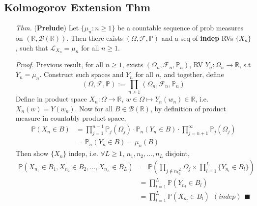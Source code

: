 \documentclass[a4paper,12pt,twoside]{book}
\begin{document}
\subsection{Kolmogorov Extension Thm}
\begin{itemize}
	\item[\textit{Thm.}] (\textbf{Prelude}) Let $\{\mu_n: n\geq 1\}$ be a countable sequence of prob measures on $(\mathbb{R}, \mathscr{B}(\mathbb{R}))$. Then there exists $(\Omega, \mathcal{F}, \mathbb{P})$ and a seq of \textbf{indep} RVs $\{X_n\}$, such that $\mathcal{L}_{X_n}=\mu_n$ for all $n\geq 1$.

	\item[\textit{Proof.}] Previous result, for all $n\geq1$, exists $(\Omega_n, \mathcal{F}_n, \mathbb{P}_n)$, RV $Y_n:\Omega_n \to \mathbb{R}$, s.t $Y_n=\mu_n$. \newline
	Construct such spaces and $Y_n$ for all $n$, and together, define 
	\begin{equation}
		(\Omega, \mathcal{F}, \mathbb{P}):=\prod_{n\geq1}(\Omega_n, \mathcal{F}_n, \mathbb{P}_n)
	\end{equation}
	Define in product space $X_n: \Omega\to \mathbb{R}$, $w\in \Omega\mapsto Y_n(w_n)\in \mathbb{R}$, i.e. $X_n(w)=Y(w_n)$. Now for all $B\in \mathscr{B}(\mathbb{R})$, by definition of product measure in countably product space,
	\begin{equation}
		\begin{split}
			\mathbb{P}\left(X_n \in B\right)&=\prod_{j=1}^{n-1}\mathbb{P}_j\left(\Omega_j\right) \cdot \mathbb{P}_n\left(Y_n\in B\right)\cdot \prod_{j=n+1}^{\infty}\mathbb{P}_j\left(\Omega_j\right)\\
			&=\mathbb{P}_n\left(Y_n \in B\right)=\mu_n(B)
		\end{split}
	\end{equation}
	Then show $\{X_n\}$ indep, i.e. $\forall L\geq 1$, $n_1, n_2, ..., n_L$ disjoint,
	\begin{equation}
		\begin{split}
			\mathbb{P}\left(X_{n_1}\in B_1, X_{n_2}\in B_2 ,..., X_{n_L} \in B_L \right)&=\mathbb{P}\left(\prod_{j\notin{n_k}_1^L}\Omega_j \times \prod_{l=1}^L\{Y_{n_l}\in B_l\}\right)\\
			&=\prod_{l=1}^L \mathbb{P}\left(Y_{n_l}\in B_l\right)\\
			&=\prod_{l=1}^L \mathbb{P}\left(X_{n_l}\in B_l\right)~~(indep)~~\blacksquare
		\end{split}	
	\end{equation}


\end{itemize}
\end{document}
